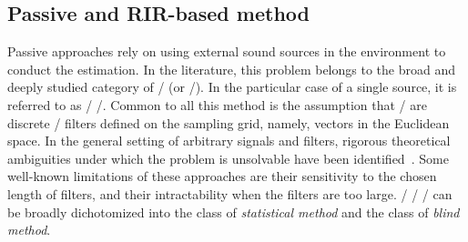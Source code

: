 \subsection{Passive and RIR-based method}
Passive approaches
rely on using external sound sources in the environment to conduct the estimation.
In the literature, this problem belongs to the broad and deeply studied category of \BCEdef/ (or \BSIdef/).
In the particular case of a single source, it is referred to as \SIMO/ \BCEdef/.
Common to all this method is the assumption that \RIR/ are discrete \FIR/ filters defined on the sampling grid, namely, vectors in the Euclidean space.
In the general setting of arbitrary signals and filters, rigorous theoretical ambiguities under which the problem is unsolvable have been identified~.
Some well-known limitations of these approaches are their sensitivity to the chosen length of filters, and their intractability when the filters are too large.
\FIR/ \SIMO/ \BCE/ can be broadly dichotomized into the class of \textit{statistical method} and the class of \textit{blind method}.


